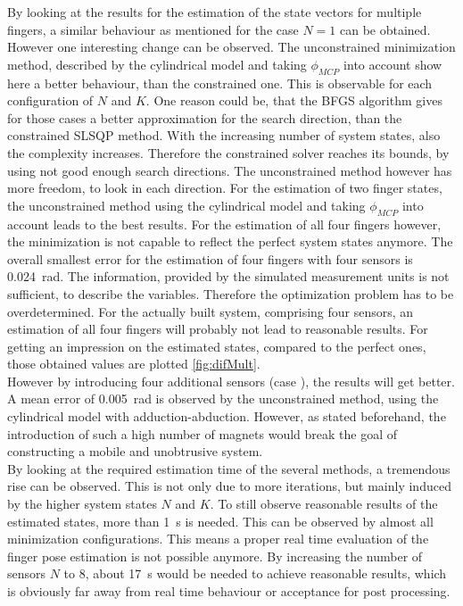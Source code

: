 By looking at the results for the estimation of the state vectors for multiple fingers, a similar behaviour as mentioned for the case $ N = 1 $ can be obtained. However one interesting change can be observed. The unconstrained minimization method, described by the cylindrical model and taking $ \phi_{MCP} $ into account show here a better behaviour, than the constrained one. This is observable for each configuration of $ N $ and $ K $. One reason could be, that the \ac{BFGS} algorithm gives for those cases a better approximation for the search direction, than the constrained \ac{SLSQP} method. With the increasing number of system states, also the complexity increases. Therefore the constrained solver reaches its bounds, by using not good enough search directions. The unconstrained method however has more freedom, to look in each direction. For the estimation of two finger states, the unconstrained method using the cylindrical model and taking $ \phi_{MCP} $ into account leads to the best results. For the estimation of all four fingers however, the minimization is not capable to reflect the perfect system states anymore. The overall smallest error for the estimation of four fingers with four sensors is \SI{0.024}{\radian}. The information, provided by the simulated measurement units is not sufficient, to describe the variables. Therefore the optimization problem has to be overdetermined. For the actually built system, comprising four sensors, an estimation of all four fingers will probably not lead to reasonable results. For getting an impression on the estimated states, compared to the perfect ones, those obtained values are plotted \ref{fig:difMult}. \\
However by introducing four additional sensors (case  \grqq), the results will get better. A mean error of \SI{0.005}{\radian} is observed by the unconstrained method, using the cylindrical model with adduction-abduction. However, as stated beforehand, the introduction of such a high number of magnets would break the goal of constructing a mobile and unobtrusive system. \\
By looking at the required estimation time of the several methods, a tremendous rise can be observed. This is not only due to more iterations, but mainly induced by the higher system states $ N $ and $ K $. To still observe reasonable results of the estimated states, more than \SI{1}{\second} is needed. This can be observed by almost all minimization configurations. This means a proper real time evaluation of the finger pose estimation is not possible anymore. By increasing the number of sensors $ N $ to 8, about \SI{17}{\second} would be needed to achieve reasonable results, which is obviously far away from real time behaviour or acceptance for post processing. \\

